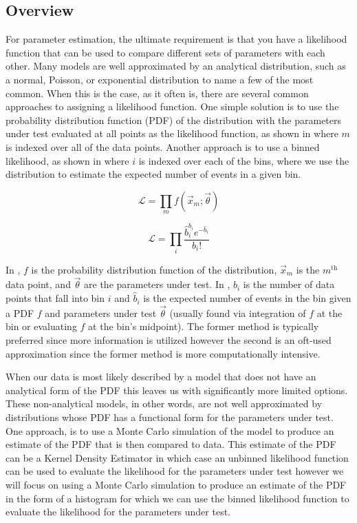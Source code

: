 \subsection{Overview}

For parameter estimation, the ultimate requirement is that you have a likelihood function that can be used to compare different sets of parameters with each other.  Many models are well approximated by an analytical distribution, such as a normal, Poisson, or exponential distribution to name a few of the most common.  When this is the case, as it often is, there are several common approaches to assigning a likelihood function.  One simple solution is to use the probability distribution function (PDF) of the distribution with the parameters under test evaluated at all points as the likelihood function, as shown in  where $m$ is indexed over all of the data points.  Another approach is to use a binned likelihood, as shown in  where $i$ is indexed over each of the bins, where we use the distribution to estimate the expected number of events in a given bin. 


\begin{equation}
        \label{eqn:gpu_unbinned_likelihood}
        \mathcal{L} = \prod_m f(\vec{x}_m; \vec{\theta})
\end{equation}

\begin{equation}
        \label{eqn:gpu_binned_likelihood}
        \mathcal{L} = \prod_i \frac{\hat{b}_i^{b_i} e^{-\hat{b}_i}}{b_i!}
\end{equation}


In , $f$ is the probability distribution function of the distribution, $\vec{x}_m$ is the $m^{\textrm{th}}$ data point, and $\vec{\theta}$ are the parameters under test.  In , $b_i$ is the number of data points that fall into bin $i$ and $\hat{b}_i$ is the expected number of events in the bin given a PDF $f$ and parameters under test $\vec{\theta}$ (usually found via integration of $f$ at the bin or evaluating $f$ at the bin's midpoint).  The former method is typically preferred since more information is utilized however the second is an oft-used approximation since the former method is more computationally intensive.


When our data is most likely described by a model that does not have an analytical form of the PDF this leaves us with significantly more limited options.  These non-analytical models, in other words, are not well approximated by distributions whose PDF has a functional form for the parameters under test.  One approach, is to use a Monte Carlo simulation of the model to produce an estimate of the PDF that is then compared to data.  This estimate of the PDF can be a Kernel Density Estimator \cite{terrell1992variable} in which case an unbinned likelihood function can be used to evaluate the likelihood for the parameters under test however we will focus on using a Monte Carlo simulation to produce an estimate of the PDF in the form of a histogram for which we can use the binned likelihood function to evaluate the likelihood for the parameters under test.


